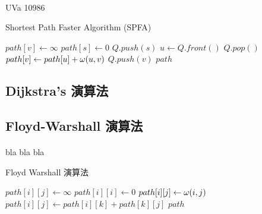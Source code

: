 \documentclass[12pt,a4paper,oneside]{report}
\begin{document}
\begin{CJK}{UTF8}{bkai}
\paragraph{}UVa 10986
\begin{algorithm}
\caption{Shortest Path Faster Algorithm (SPFA)}
\label{algo:shortest_path_spfa}
\begin{algorithmic}[1]
  \State{}
    \State $path[v]\gets\infty$
  \EndFor
  \State $path[s]\gets{0}$
  \State $Q.push(s)$
    \State $u\gets{Q.front()}$
    \State $Q.pop()$
        \State $path[v]\gets{path[u]+\omega{\ensuremath{({u},{v})}}}$
          \State $Q.push(v)$
        \EndIf
      \EndIf
    \EndFor
  \EndWhile
  \State \Return $path$
\EndProcedure
\end{algorithmic}
\end{algorithm}

\subsection{Dijkstra's 演算法}

\subsection{Floyd-Warshall 演算法}
\paragraph{}bla bla bla
\begin{algorithm}
\caption{Floyd Warshall 演算法}
\label{algo:shortest_path_floyd_warshall}
\begin{algorithmic}[1]
  \State{}
        \State $path[i][j]\gets{\infty}$
      \Else
        \State $path[i][i]\gets{0}$
      \EndIf
    \EndFor
  \EndFor
    \State $path[i][j]\gets{\omega{\ensuremath{({i},{j})}}}$
  \EndFor
          \State $path[i][j]\gets{path[i][k]+path[k][j]}$
        \EndIf
      \EndFor
    \EndFor
  \EndFor
  \State \Return $path$
\EndProcedure
\end{algorithmic}
\end{algorithm}


\end{CJK}
\end{document}
